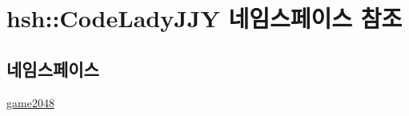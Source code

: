 \hypertarget{namespacehsh_1_1_code_lady_j_j_y}{}\section{hsh\+:\+:Code\+Lady\+J\+JY 네임스페이스 참조}
\label{namespacehsh_1_1_code_lady_j_j_y}
\subsection*{네임스페이스}
\begin{DoxyCompactItemize}
\item 
 \hyperlink{namespacehsh_1_1_code_lady_j_j_y_1_1game2048}{game2048}
\end{DoxyCompactItemize}
